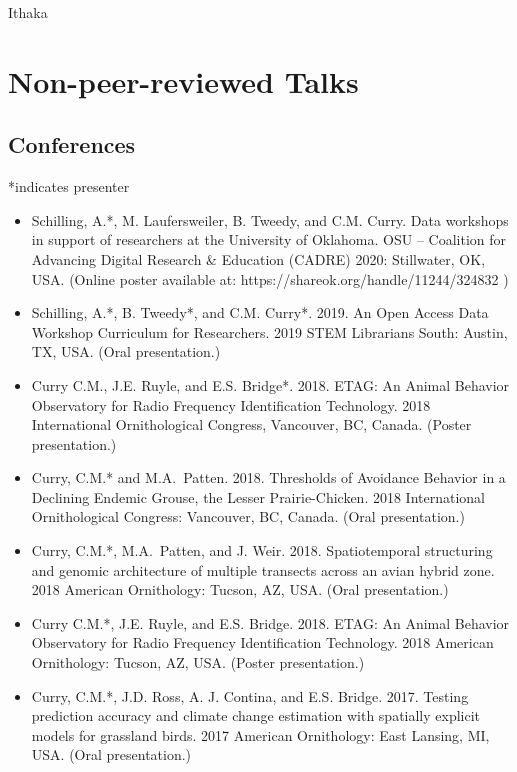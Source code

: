 \documentclass[
  letterpaper,
  DIV=11,
  numbers=noendperiod,
  oneside]{scrreprt}
\providecommand{\tightlist}{%
  \setlength{\itemsep}{0pt}\setlength{\parskip}{0pt}}\usepackage{longtable,booktabs,array}
\begin{document}
Ithaka

\section{Non-peer-reviewed Talks}\label{non-peer-reviewed-talks}

\subsection{Conferences}\label{conferences}

*indicates presenter

\begin{itemize}
\tightlist
\item
  Schilling, A.*, M. Laufersweiler, B. Tweedy, and C.M. Curry. Data
  workshops in support of researchers at the University of Oklahoma. OSU
  -- Coalition for Advancing Digital Research \& Education (CADRE) 2020:
  Stillwater, OK, USA. (Online poster available at:
  https://shareok.org/handle/11244/324832 )
\item
  Schilling, A.*, B. Tweedy*, and C.M. Curry*. 2019. An Open Access Data
  Workshop Curriculum for Researchers. 2019 STEM Librarians South:
  Austin, TX, USA. (Oral presentation.)
\item
  Curry C.M., J.E. Ruyle, and E.S. Bridge*. 2018. ETAG: An Animal
  Behavior Observatory for Radio Frequency Identification Technology.
  2018 International Ornithological Congress, Vancouver, BC, Canada.
  (Poster presentation.)
\item
  Curry, C.M.* and M.A.~Patten. 2018. Thresholds of Avoidance Behavior
  in a Declining Endemic Grouse, the Lesser Prairie-Chicken. 2018
  International Ornithological Congress: Vancouver, BC, Canada. (Oral
  presentation.)
\item
  Curry, C.M.*, M.A.~Patten, and J. Weir. 2018. Spatiotemporal
  structuring and genomic architecture of multiple transects across an
  avian hybrid zone. 2018 American Ornithology: Tucson, AZ, USA. (Oral
  presentation.)
\item
  Curry C.M.*, J.E. Ruyle, and E.S. Bridge. 2018. ETAG: An Animal
  Behavior Observatory for Radio Frequency Identification Technology.
  2018 American Ornithology: Tucson, AZ, USA. (Poster presentation.)
\item
  Curry, C.M.*, J.D. Ross, A. J. Contina, and E.S. Bridge. 2017. Testing
  prediction accuracy and climate change estimation with spatially
  explicit models for grassland birds. 2017 American Ornithology: East
  Lansing, MI, USA. (Oral presentation.)

\end{itemize}
\end{document}
